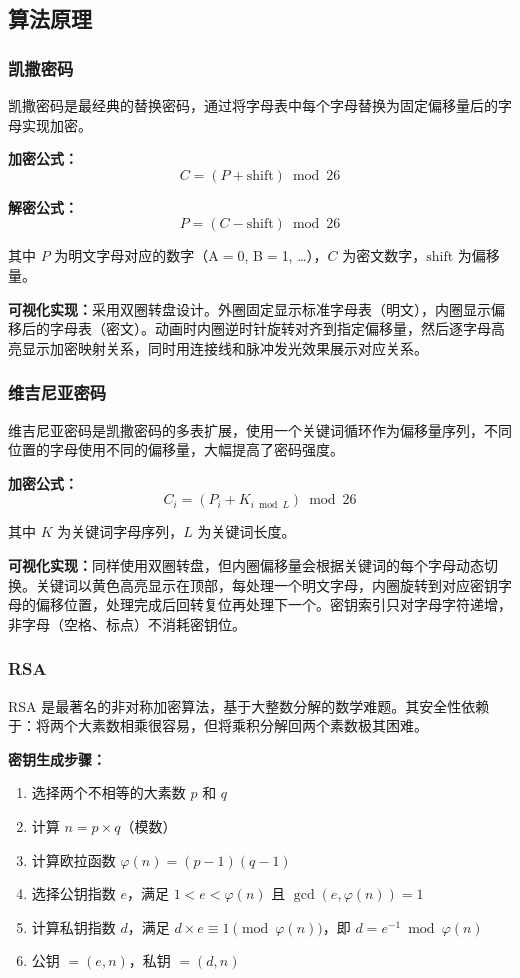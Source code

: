 \documentclass[a4paper,UTF8]{ctexart}
\begin{document}
\subsection{算法原理}

\subsubsection{凯撒密码}

凯撒密码是最经典的替换密码，通过将字母表中每个字母替换为固定偏移量后的字母实现加密。

\textbf{加密公式：}
\[
  C = (P + \text{shift}) \bmod 26
\]

\textbf{解密公式：}
\[
  P = (C - \text{shift}) \bmod 26
\]

其中 $P$ 为明文字母对应的数字（A$=$0, B$=$1, \ldots），$C$ 为密文数字，$\text{shift}$ 为偏移量。

\textbf{可视化实现：}采用双圈转盘设计。外圈固定显示标准字母表（明文），内圈显示偏移后的字母表（密文）。动画时内圈逆时针旋转对齐到指定偏移量，然后逐字母高亮显示加密映射关系，同时用连接线和脉冲发光效果展示对应关系。

\subsubsection{维吉尼亚密码}

维吉尼亚密码是凯撒密码的多表扩展，使用一个关键词循环作为偏移量序列，不同位置的字母使用不同的偏移量，大幅提高了密码强度。

\textbf{加密公式：}
\[
  C_i = (P_i + K_{i \bmod L}) \bmod 26
\]

其中 $K$ 为关键词字母序列，$L$ 为关键词长度。

\textbf{可视化实现：}同样使用双圈转盘，但内圈偏移量会根据关键词的每个字母动态切换。关键词以黄色高亮显示在顶部，每处理一个明文字母，内圈旋转到对应密钥字母的偏移位置，处理完成后回转复位再处理下一个。密钥索引只对字母字符递增，非字母（空格、标点）不消耗密钥位。

\subsubsection{RSA}

RSA 是最著名的非对称加密算法，基于大整数分解的数学难题。其安全性依赖于：将两个大素数相乘很容易，但将乘积分解回两个素数极其困难。

\textbf{密钥生成步骤：}
\begin{enumerate}
  \item 选择两个不相等的大素数 $p$ 和 $q$
  \item 计算 $n = p \times q$（模数）
  \item 计算欧拉函数 $\varphi(n) = (p-1)(q-1)$
  \item 选择公钥指数 $e$，满足 $1 < e < \varphi(n)$ 且 $\gcd(e, \varphi(n)) = 1$
  \item 计算私钥指数 $d$，满足 $d \times e \equiv 1 \pmod{\varphi(n)}$，即 $d = e^{-1} \bmod \varphi(n)$
  \item 公钥 $= (e, n)$，私钥 $= (d, n)$
\end{enumerate}
\end{document}
